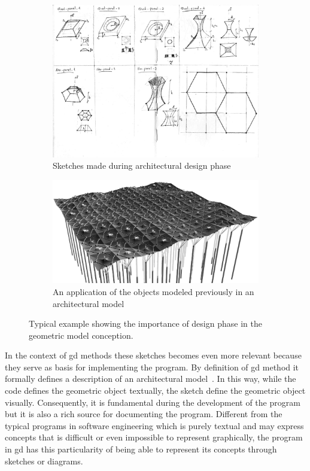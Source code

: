 \begin{figure}[h]
\centering
\begin{subfigure}{.6\textwidth}
  \centering
  \includegraphics[width=.95\linewidth]{images/real-sketch}
  \caption{Sketches made during architectural design phase}
  \label{fig:sketch-fig}
\end{subfigure}%
\begin{subfigure}{.4\textwidth}
  \centering
  \includegraphics[width=1.0\linewidth]{images/real-sketch-result1}
  \caption{An application of the objects modeled previously in an architectural model}
  \label{fig:sketch-fig-result}
\end{subfigure}
\caption{Typical example showing the importance of design phase in the geometric model conception.}
\label{fig:sketch-using}
\end{figure}

In the context of \gls{gd} methods these sketches becomes even more relevant because they serve as basis for implementing the program. By definition of \gls{gd} method it formally defines a description of an architectural model~\citep{mccormack2004generative}. In this way, while the code defines the geometric object textually, the sketch define the geometric object visually. Consequently, it is fundamental during the development of the program but it is also a rich source for documenting the program. Different from the typical programs in software engineering which is purely textual and may express concepts that is difficult or even impossible to represent graphically, the program in \gls{gd} has this particularity of being able to represent its concepts through sketches or diagrams.

